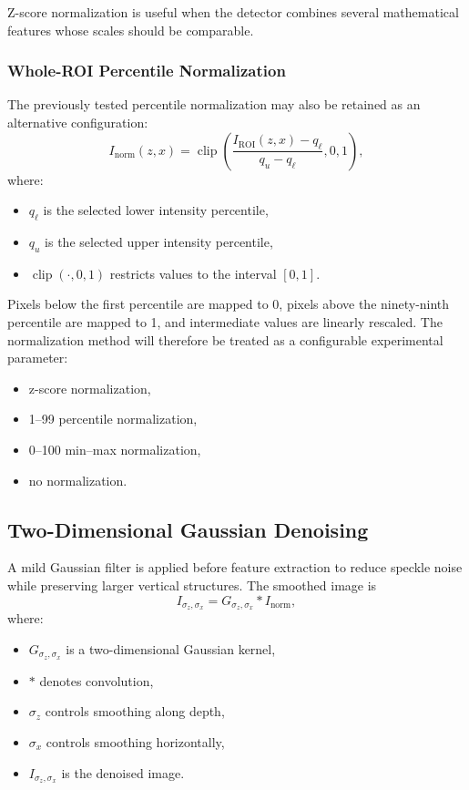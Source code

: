 \documentclass[11pt]{article}
\begin{document}
Z-score normalization is useful when the detector combines several mathematical
features whose scales should be comparable.

\subsubsection{Whole-ROI Percentile Normalization}
The previously tested percentile normalization may also be retained as an
alternative configuration:
\[
I_{\mathrm{norm}}(z,x)
=
\operatorname{clip}
\left(
\frac{
I_{\mathrm{ROI}}(z,x)-q_{\ell}
}{
q_{u}-q_{\ell}
},
0,
1
\right),
\]
where:
\begin{itemize}
    \item \(q_{\ell}\) is the selected lower intensity percentile,
    \item \(q_{u}\) is the selected upper intensity percentile,
    \item \(\operatorname{clip}(\cdot,0,1)\) restricts values to the interval
    \([0,1]\).
\end{itemize}

Pixels below the first percentile are mapped to 0, pixels above the
ninety-ninth percentile are mapped to 1, and intermediate values are linearly
rescaled.
The normalization method will therefore be treated as a configurable
experimental parameter:
\begin{itemize}
    \item z-score normalization,
    \item 1--99 percentile normalization,
    \item 0--100 min--max normalization,
    \item no normalization.
\end{itemize}


\subsection{Two-Dimensional Gaussian Denoising}
A mild Gaussian filter is applied before feature extraction to reduce speckle
noise while preserving larger vertical structures.
The smoothed image is
\[
I_{\sigma_z,\sigma_x}
=
G_{\sigma_z,\sigma_x}
*
I_{\mathrm{norm}},
\]
where:
\begin{itemize}
    \item \(G_{\sigma_z,\sigma_x}\) is a two-dimensional Gaussian kernel,
    \item \(*\) denotes convolution,
    \item \(\sigma_z\) controls smoothing along depth,
    \item \(\sigma_x\) controls smoothing horizontally,
    \item \(I_{\sigma_z,\sigma_x}\) is the denoised image.
\end{itemize}
\end{document}
